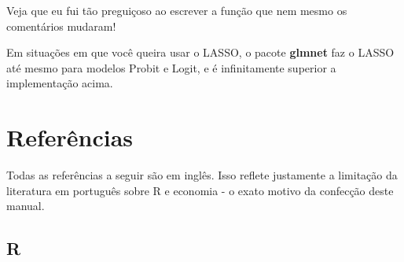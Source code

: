 \documentclass[
]{book}
\newenvironment{Shaded}{\begin{snugshade}}{\end{snugshade}}
\newcommand{\CommentTok}[1]{\textcolor[rgb]{0.56,0.35,0.01}{\textit{#1}}}
\newcommand{\ControlFlowTok}[1]{\textcolor[rgb]{0.13,0.29,0.53}{\textbf{#1}}}
\newcommand{\DataTypeTok}[1]{\textcolor[rgb]{0.13,0.29,0.53}{#1}}
\newcommand{\DecValTok}[1]{\textcolor[rgb]{0.00,0.00,0.81}{#1}}
\newcommand{\FloatTok}[1]{\textcolor[rgb]{0.00,0.00,0.81}{#1}}
\newcommand{\KeywordTok}[1]{\textcolor[rgb]{0.13,0.29,0.53}{\textbf{#1}}}
\newcommand{\NormalTok}[1]{#1}
\newcommand{\OperatorTok}[1]{\textcolor[rgb]{0.81,0.36,0.00}{\textbf{#1}}}
\newcommand{\StringTok}[1]{\textcolor[rgb]{0.31,0.60,0.02}{#1}}
\begin{document}
\begin{Shaded}
\end{Shaded}

Veja que eu fui tão preguiçoso ao escrever a função que nem mesmo os comentários mudaram!

Em situações em que você queira usar o LASSO, o pacote \textbf{glmnet} faz o LASSO até mesmo para modelos Probit e Logit, e é infinitamente superior a implementação acima.

\hypertarget{referuxeancias}{%
\chapter{Referências}\label{referuxeancias}}

Todas as referências a seguir são em inglês. Isso reflete justamente a limitação da literatura em português sobre R e economia - o exato motivo da confecção deste manual.

\hypertarget{r}{%
\section{R}\label{r}}
\end{document}
